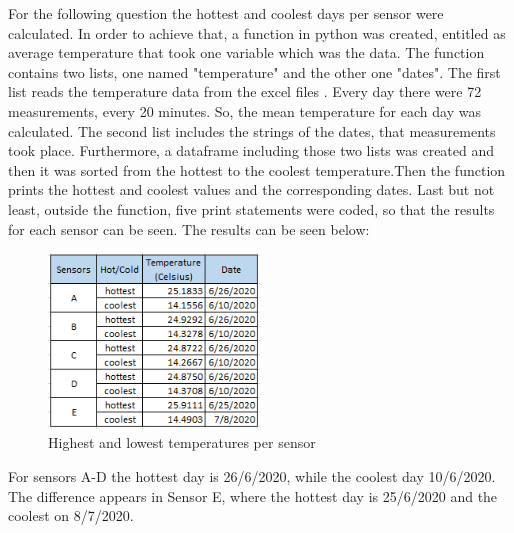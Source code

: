 \documentclass[a4paper,12pt]{article} %
\begin{document}
For the following question the hottest and coolest days per sensor were calculated. In order to achieve that, a function in python was created, entitled as average temperature that took one variable which was the data. The function contains two lists, one named "temperature" and the other one "dates". The first list reads the temperature data from the excel files \cite{Maiullari2020}. Every day there were 72 measurements, every 20 minutes. So, the mean temperature for each day was calculated. The second list includes the strings of the dates, that measurements took place. Furthermore, a dataframe including those two lists was created and then it was sorted from the hottest to the coolest temperature.Then the function prints the hottest and coolest values and the corresponding dates. Last but not least, outside the function, five print statements were coded, so that the results for each sensor can be seen. The results can be seen below:

\begin{figure}[H] %
	\centering %
	\includegraphics[width=0.5\textwidth]{Bonus.png} 
	\caption{Highest and lowest temperatures per sensor} %
\end{figure}

For sensors A-D the hottest day is 26/6/2020, while the coolest day 10/6/2020. The difference appears in Sensor E, where the hottest day is 25/6/2020 and the coolest on 8/7/2020.



\end{document}
